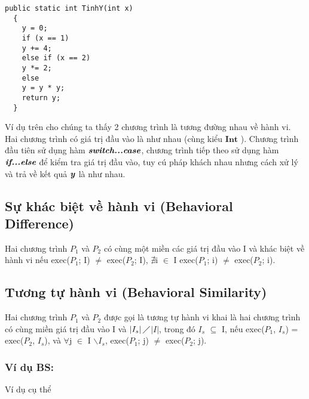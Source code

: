 \begin{lstlisting}[language={[Sharp]C}, caption={Tính y, sử dụng hàm If...else}, label={Script}]
  public static int TinhY(int x)
  {
    y = 0;
    if (x == 1)
    y += 4;
    else if (x == 2)
    y *= 2;
    else
    y = y * y;
    return y;
  }
\end{lstlisting}

Ví dụ trên cho chúng ta thấy 2 chương trình là tương đường nhau về
hành vi. Hai chương trình có giá trị đầu vào là như nhau (cùng kiểu
$\textbf{Int}$ ). Chương trình đầu tiên sử dụng hàm
$\textit{\textbf{switch...case}}$, chương trình tiếp theo sử dụng hàm
$\textit{\textbf{if...else}}$ để kiểm tra giá trị đầu vào, tuy cú pháp
khách nhau nhưng cách xử lý và trả về kết quả $\textbf{\textit{y}}$ là
như nhau.
	
\subsection{Sự khác biệt về hành vi (Behavioral Difference)}

\begin{definition}
  Hai chương trình $P_{1}$ và $P_{2}$ có cùng một miền các giá trị đầu
  vào I và khác biệt về hành vi nếu exec($P_{1}$; I) $\neq$
  exec($P_{2}$; I), $\nexists$i $\in$ I exec($P_{1}$; i) $\neq$
  exec($P_{2}$; i).
\end{definition}

	
\subsection{Tương tự hành vi (Behavioral Similarity)}

\begin{definition}
  Hai chương trình $P_{1}$ và $P_{2}$ được gọi là tương tự hành vi
  khai là hai chương trình có cùng miền giá trị đầu vào I và
  $\left|I_{s}\right|\diagup$$\left|I\right|$, trong đó
  $I_{s}$ $\subseteq $ I, nếu exec($P_{1}$, $I_{s}$) =
  exec($P_{2}$, $I_{s}$), và $\forall$j $\in$ I
  $\backslash$$I_{s}$, exec($P_{1}$; j) $\neq$ exec($P_{2}$; j).
\end{definition}


\subsubsection{Ví dụ BS:}
	Ví dụ cụ thể
	


